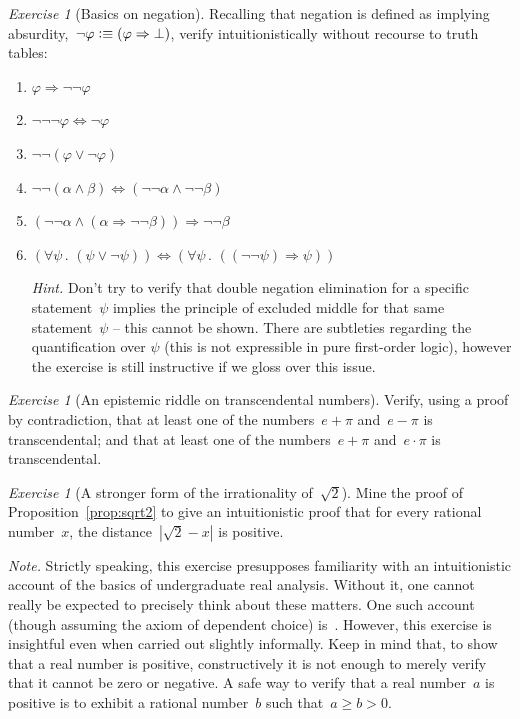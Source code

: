 \documentclass[10pt,reqno,a4paper,openany]{amsbook}
\theoremstyle{definition}
\theoremstyle{plain}
\theoremstyle{remark}
\newcommand{\?}{\,{:}\,}
\renewcommand{\_}{\mathpunct{.}\,}
\newcommand{\defequiv}{\vcentcolon\equiv}
\newtheorem{exercise}[defn]{Exercise}
\begin{document}
\begin{exercise}[Basics on negation]
Recalling that negation is defined as implying absurdity,~$\neg\varphi
\defequiv (\varphi \Rightarrow \bot)$, verify intuitionistically without
recourse to truth tables:
\begin{enumerate}
\item $\varphi \Rightarrow \neg\neg\varphi$
\item $\neg\neg\neg\varphi \Leftrightarrow \neg\varphi$
\item $\neg\neg(\varphi \vee \neg\varphi)$
\item $\neg\neg(\alpha \wedge \beta) \Leftrightarrow (\neg\neg\alpha \wedge
\neg\neg\beta)$
\item $(\neg\neg\alpha \wedge (\alpha \Rightarrow \neg\neg\beta)) \Longrightarrow
\neg\neg\beta$
\item $(\forall\psi\_ (\psi \vee \neg\psi))
\Longleftrightarrow (\forall\psi\_ ((\neg\neg\psi) \Rightarrow
\psi))$

{\noindent\scriptsize\emph{Hint.}
Don't try to verify that double negation elimination for a specific
statement~$\psi$ implies the principle of excluded middle for that same
statement~$\psi$ -- this cannot be shown. There are subtleties regarding the
quantification over $\psi$ (this is not expressible in pure first-order logic),
however the exercise is still instructive if we gloss over this issue.\par}
\end{enumerate}
\end{exercise}

\begin{exercise}[An epistemic riddle on transcendental numbers]
Verify, using a proof by contradiction, that at least one of the numbers~$e +
\pi$ and~$e - \pi$ is transcendental; and that at least one of the
numbers~$e + \pi$ and~$e \cdot \pi$ is transcendental.
\end{exercise}

\begin{exercise}[A stronger form of the irrationality of~$\sqrt{2}$]
\label{ex:sqrt2}
Mine the proof of Proposition~\ref{prop:sqrt2} to give an intuitionistic proof
that for every rational number~$x$, the distance~$|\sqrt{2}-x|$ is positive.

{\noindent\scriptsize\emph{Note.} Strictly speaking, this exercise presupposes
familiarity with an intuitionistic account of the basics of undergraduate real
analysis. Without it, one cannot really be expected to precisely think about
these matters. One such account (though assuming the axiom of dependent choice)
is~\cite{bishop-bridges:bible}. However, this exercise is insightful even when carried out
slightly informally. Keep in mind that, to show that a real number is positive,
constructively it is not enough to merely verify that it cannot be zero or
negative. A safe way to verify that a real number~$a$ is positive is to exhibit
a rational number~$b$ such that~$a \geq b > 0$.\par}
\end{exercise}
\end{document}
